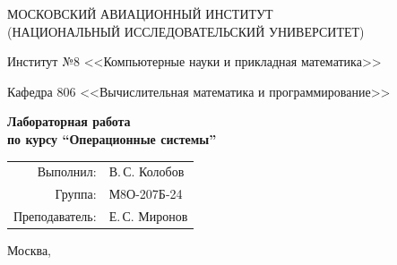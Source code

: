 \begin{titlepage}
\begin{center}
\large
МОСКОВСКИЙ АВИАЦИОННЫЙ ИНСТИТУТ\\ (НАЦИОНАЛЬНЫЙ ИССЛЕДОВАТЕЛЬСКИЙ УНИВЕРСИТЕТ)

\vspace{20pt}

Институт №8 <<Компьютерные науки и прикладная математика>>

Кафедра 806 <<Вычислительная математика и программирование>>
\end{center}

\vspace{60pt}

\begin{center}
\bfseries
\large
Лабораторная работа  \\по курсу \enquote{Операционные системы}

\vspace{54pt}

\end{center}

\vfill

\begin{flushright}
\large
\begin{tabular}{rl}
Выполнил: & В.\,С. Колобов \\
Группа: & М8О-207Б-24 \\
Преподаватель: & Е.\,С. Миронов \\
\end{tabular}
\end{flushright}

\vspace{92pt}

\begin{center}
\large
Москва, \the\year
\end{center}
\end{titlepage}

\pagebreak
